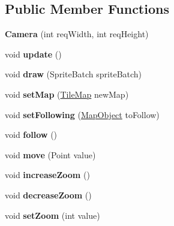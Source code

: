 \subsection*{Public Member Functions}
\begin{DoxyCompactItemize}
\item 
\hypertarget{class_simple_r_p_g_1_1_camera_a3df3d47b11911673673c2b6f4ca93f2b}{{\bfseries Camera} (int req\+Width, int req\+Height)}\label{class_simple_r_p_g_1_1_camera_a3df3d47b11911673673c2b6f4ca93f2b}

\item 
\hypertarget{class_simple_r_p_g_1_1_camera_a4aff6363c8bdfabb2f56fe779272ad0b}{void {\bfseries update} ()}\label{class_simple_r_p_g_1_1_camera_a4aff6363c8bdfabb2f56fe779272ad0b}

\item 
\hypertarget{class_simple_r_p_g_1_1_camera_a57ce092c1b4078fd61a3179c2ab8b93c}{void {\bfseries draw} (Sprite\+Batch sprite\+Batch)}\label{class_simple_r_p_g_1_1_camera_a57ce092c1b4078fd61a3179c2ab8b93c}

\item 
\hypertarget{class_simple_r_p_g_1_1_camera_aa79c2b9a8151f5441c694f5e6ccd2cfd}{void {\bfseries set\+Map} (\hyperlink{class_simple_r_p_g_1_1_tile_map}{Tile\+Map} new\+Map)}\label{class_simple_r_p_g_1_1_camera_aa79c2b9a8151f5441c694f5e6ccd2cfd}

\item 
\hypertarget{class_simple_r_p_g_1_1_camera_ac252db1ef72425c155d7914a408320bd}{void {\bfseries set\+Following} (\hyperlink{class_simple_r_p_g_1_1_map_object}{Map\+Object} to\+Follow)}\label{class_simple_r_p_g_1_1_camera_ac252db1ef72425c155d7914a408320bd}

\item 
\hypertarget{class_simple_r_p_g_1_1_camera_a0fd8e940f8f45fa9b2d6a8dc625211ea}{void {\bfseries follow} ()}\label{class_simple_r_p_g_1_1_camera_a0fd8e940f8f45fa9b2d6a8dc625211ea}

\item 
\hypertarget{class_simple_r_p_g_1_1_camera_a9765209fd53634d10039c02ac3efc58e}{void {\bfseries move} (Point value)}\label{class_simple_r_p_g_1_1_camera_a9765209fd53634d10039c02ac3efc58e}

\item 
\hypertarget{class_simple_r_p_g_1_1_camera_a49af7ca99f42cb5fe226fdc40c9cf4bd}{void {\bfseries increase\+Zoom} ()}\label{class_simple_r_p_g_1_1_camera_a49af7ca99f42cb5fe226fdc40c9cf4bd}

\item 
\hypertarget{class_simple_r_p_g_1_1_camera_a5a97dec2fa082efa5b3d58ac96d04af3}{void {\bfseries decrease\+Zoom} ()}\label{class_simple_r_p_g_1_1_camera_a5a97dec2fa082efa5b3d58ac96d04af3}

\item 
\hypertarget{class_simple_r_p_g_1_1_camera_a8822f4b9d972bd6c4cf21d0c1c74ee1f}{void {\bfseries set\+Zoom} (int value)}\label{class_simple_r_p_g_1_1_camera_a8822f4b9d972bd6c4cf21d0c1c74ee1f}

\end{DoxyCompactItemize}
